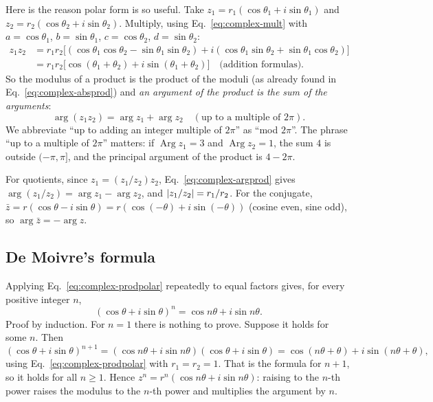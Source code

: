 Here is the reason polar form is so useful. Take $z_1=r_1(\cos\theta_1+i\sin\theta_1)$ and $z_2=r_2(\cos\theta_2+i\sin\theta_2)$. Multiply, using Eq.~\eqref{eq:complex-mult} with $a=\cos\theta_1$, $b=\sin\theta_1$, $c=\cos\theta_2$, $d=\sin\theta_2$:
\begin{align}
z_1z_2&=r_1r_2\bigl[(\cos\theta_1\cos\theta_2-\sin\theta_1\sin\theta_2)+i(\cos\theta_1\sin\theta_2+\sin\theta_1\cos\theta_2)\bigr]\nonumber\\
&=r_1r_2\bigl[\cos(\theta_1+\theta_2)+i\sin(\theta_1+\theta_2)\bigr]\quad\text{(addition formulas)}.\label{eq:complex-prodpolar}
\end{align}
So the modulus of a product is the product of the moduli (as already found in Eq.~\eqref{eq:complex-absprod}) and \emph{an argument of the product is the sum of the arguments}:
\begin{equation}
\arg(z_1z_2)=\arg z_1+\arg z_2\quad(\text{up to a multiple of }2\pi).\label{eq:complex-argprod}
\end{equation}
We abbreviate ``up to adding an integer multiple of $2\pi$'' as ``mod $2\pi$''. The phrase ``up to a multiple of $2\pi$'' matters: if $\operatorname{Arg}z_1=3$ and $\operatorname{Arg}z_2=1$, the sum $4$ is outside $(-\pi,\pi]$, and the principal argument of the product is $4-2\pi$.

For quotients, since $z_1=(z_1/z_2)z_2$, Eq.~\eqref{eq:complex-argprod} gives $\arg(z_1/z_2)=\arg z_1-\arg z_2$, and $\left\lvert z_1/z_2\right\rvert=r_1/r_2$. For the conjugate, $\bar z=r(\cos\theta-i\sin\theta)=r(\cos(-\theta)+i\sin(-\theta))$ (cosine even, sine odd), so $\arg\bar z=-\arg z$.

\subsection{De Moivre's formula}

Applying Eq.~\eqref{eq:complex-prodpolar} repeatedly to equal factors gives, for every positive integer $n$,
\begin{equation}
(\cos\theta+i\sin\theta)^n=\cos n\theta+i\sin n\theta .\label{eq:complex-demoivre}
\end{equation}
Proof by induction. For $n=1$ there is nothing to prove. Suppose it holds for some $n$. Then
\[
(\cos\theta+i\sin\theta)^{n+1}=(\cos n\theta+i\sin n\theta)(\cos\theta+i\sin\theta)=\cos(n\theta+\theta)+i\sin(n\theta+\theta),
\]
using Eq.~\eqref{eq:complex-prodpolar} with $r_1=r_2=1$. That is the formula for $n+1$, so it holds for all $n\ge1$. Hence $z^n=r^n(\cos n\theta+i\sin n\theta)$: raising to the $n$-th power raises the modulus to the $n$-th power and multiplies the argument by $n$.

